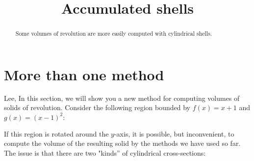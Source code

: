 \documentclass{ximera}
\title[Dig-In:]{Accumulated shells}
\begin{document}
\begin{abstract}
Some volumes of revolution are more easily computed with cylindrical shells. 
\end{abstract}
\maketitle


\section{More than one method}

Lee, In this section, we will show you a new method for computing volumes
of solids of revolution.  Consider the following region bounded by
$f(x)=x+1$ and $g(x)=(x-1)^2$:
\begin{image}
\end{image}
If this region is rotated around the $y$-axis, it is possible, but
inconvenient, to compute the volume of the resulting solid by the
methods we have used so far. The issue is that there are two
"kinds'' of cylindrical cross-sections: 
\end{document}
